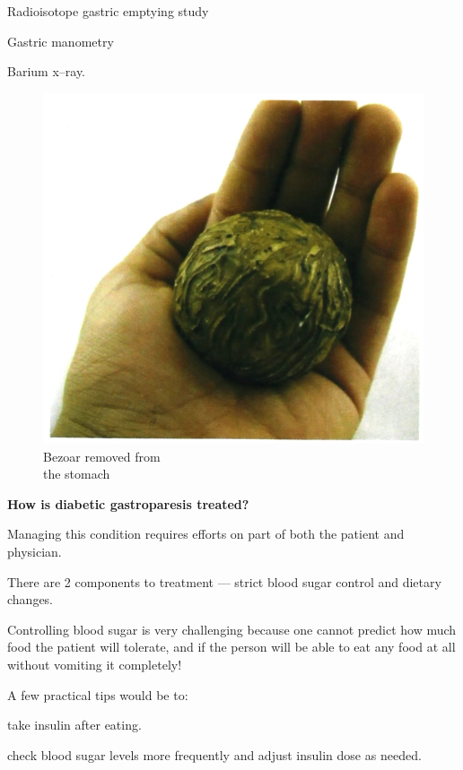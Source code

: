 \item Radioisotope gastric emptying study

 \item Gastric manometry

 \item Barium x–ray.


\begin{figure}
\includegraphics{images/077.jpg}
\caption{Bezoar removed from\\ the stomach}
\end{figure}

\textbf{How is diabetic gastroparesis treated?}

Managing this condition requires efforts on part of both the patient and physician.

There are 2 components to treatment — strict blood sugar control and dietary changes.

Controlling blood sugar is very challenging because one cannot predict how much food the patient will tolerate, and if the person will be able to eat any food at all without vomiting it completely!

A few practical tips would be to:

\item take insulin after eating.

 \item check blood sugar levels more frequently and adjust insulin dose as needed.

